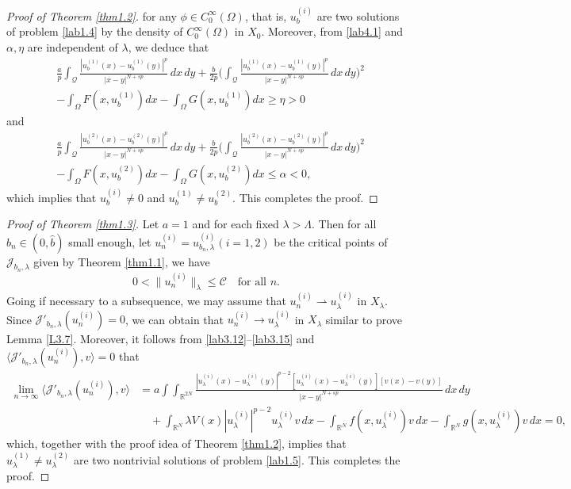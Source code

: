 \documentclass[reqno]{amsart}
\begin{document}
\begin{proof}[Proof of Theorem \ref{thm1.2}]
for any $\phi\in C^\infty_0(\Omega)$, that is, $u_b^{(i)}$ are two solutions 
of problem \eqref{lab1.4} by the density of $C^\infty_0(\Omega)$ in $X_0$. 
Moreover, from \eqref{lab4.1} and $\alpha, \eta$ are independent of $\lambda$, 
we deduce that
\begin{align*}
&\frac{a}{p}\int_\mathcal{Q}\frac{|u_b^{(1)}(x)-u_b^{(1)}(y)|^p}{|x-y|^{N+sp}}\,dx\,dy
+\frac{b}{2p}\Big(\int_\mathcal{Q}\frac{|u_b^{(1)}(x)-u_b^{(1)}(y)|^p}{|x-y|^{N+sp}}
\,dx\,dy\Big)^2    \\
&-\int_\Omega F(x,u_b^{(1)}) dx-\int_\Omega G(x,u_b^{(1)}) dx\geq\eta>0
\end{align*}
and
\begin{align*}
&\frac{a}{p}\int_\mathcal{Q}\frac{|u_b^{(2)}(x)-u_b^{(2)}(y)|^p}{|x-y|^{N+sp}}\,dx\,dy
+ \frac{b}{2p}\Big(\int_\mathcal{Q}\frac{|u_b^{(2)}(x)-u_b^{(2)}(y)|^p}{|x-y|^{N+sp}}
 \,dx\,dy\Big)^2   \\
&-\int_\Omega F(x,u_b^{(2)}) dx-\int_\Omega G(x,u_b^{(2)}) dx\leq\alpha<0,
\end{align*}
which implies that $u_b^{(i)}\neq 0$ and $u_b^{(1)}\neq u_b^{(2)}$. 
This completes the proof.
\end{proof}

\begin{proof}[Proof of Theorem \ref{thm1.3}]
Let $a=1$ and for each fixed $\lambda>\Lambda$. 
Then for all $b_n\in(0, \hat{b})$ small enough, let 
$u_n^{(i)}=u_{b_n, \lambda}^{(i)} (i=1, 2)$ be the critical points of 
$\mathcal{J}_{b_n, \lambda}$ given by Theorem \ref{thm1.1}, we have
$$
0<\|u_n^{(i)}\|_\lambda\leq \mathcal{C} \quad \text{for all } n.
$$
Going if necessary to a subsequence, we may assume that 
$u_n^{(i)}\rightharpoonup u_\lambda^{(i)}$ in $X_\lambda$. 
Since $\mathcal{J}'_{b_n, \lambda}(u_n^{(i)})=0$, we can obtain that 
$u_n^{(i)}\to  u_\lambda^{(i)}$ in $X_\lambda$ similar to prove Lemma \ref{L3.7}. 
Moreover, it follows from \eqref{lab3.12}--\eqref{lab3.15} and 
$\langle \mathcal{J}'_{b_n, \lambda}(u_n^{(i)}), v \rangle=0$ that
\begin{align*}
\lim_{n\to \infty}\langle \mathcal{J}'_{b_n, \lambda}(u_n^{(i)}), v \rangle  
&=a\int\int_{\mathbb{R}^{2N}}\frac{|u_\lambda^{(i)}(x)-u_\lambda^{(i)}(y)|^{p-2}
 [u_\lambda^{(i)}(x)-u_\lambda^{(i)}(y)][v(x)-v(y)]}{|x-y|^{N+sp}}\,dx\,dy  \\
&\quad +\int_{\mathbb{R}^N}\lambda V(x)|u_\lambda^{(i)}|^{p-2}u_\lambda^{(i)}v\,dx
 -\int_{\mathbb{R}^N}f(x,u_\lambda^{(i)})v\,dx-\int_{\mathbb{R}^N}g(x,u_\lambda^{(i)})
 v\,dx  
=0,
\end{align*}
which, together with the proof idea of Theorem \ref{thm1.2}, implies that 
$u_\lambda^{(1)}\neq u_\lambda^{(2)}$ are two nontrivial solutions of problem 
\eqref{lab1.5}. This completes the proof.
\end{proof}
\end{document}
